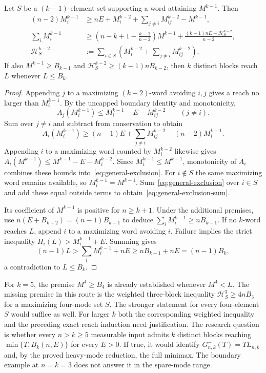 \begin{lemma}\label{lem:general-exclusion}
Let $S$ be a $(k-1)$-element set supporting a word attaining $M^{k-1}$.
Then
\begin{align}
 (n-2)M_i^{k-1}
 &\ge nE+M_i^{k-2}+\sum_{j\ne i}M_{ij}^{k-2}-M^{k-1},
       \label{eq:general-exclusion}\\
 \sum_iM_i^{k-1}
 &\ge\left(n-k+1-\frac{k-1}{n-2}\right)M^{k-1}
       +\frac{(k-1)nE+\mathcal H_S^{k-2}}{n-2},
       \label{eq:general-exclusion-sum}\\
 \mathcal H_S^{k-2}
 &:=\sum_{i\in S}\left(M_i^{k-2}+\sum_{j\ne i}M_{ij}^{k-2}\right).
       \label{eq:general-weighted-H}
\end{align}
If also $M^{k-1}\ge B_{k-1}$ and
$\mathcal H_S^{k-2}\ge(k-1)nB_{k-2}$, then $k$ distinct blocks reach
$L$ whenever $L\le B_k$.
\end{lemma}
\begin{proof}
Appending $j$ to a maximizing $(k-2)$-word avoiding $i,j$ gives a
reach no larger than $M_i^{k-1}$. By the uncapped boundary identity
and monotonicity,
\[
 A_j(M_i^{k-1})\le M_i^{k-1}-E-M_{ij}^{k-2}\qquad(j\ne i).
\]
Sum over $j\ne i$ and subtract from conservation to obtain
\[
 A_i(M_i^{k-1})\ge(n-1)E+\sum_{j\ne i}M_{ij}^{k-2}
                              -(n-2)M_i^{k-1}.
\]
Appending $i$ to a maximizing word counted by $M_i^{k-2}$ likewise
gives $A_i(M^{k-1})\le M^{k-1}-E-M_i^{k-2}$.
Since $M_i^{k-1}\le M^{k-1}$, monotonicity of $A_i$ combines these
bounds into~\eqref{eq:general-exclusion}. For $i\notin S$ the same
maximizing word remains available, so $M_i^{k-1}=M^{k-1}$.
Sum~\eqref{eq:general-exclusion} over $i\in S$ and add these equal
outside terms to obtain~\eqref{eq:general-exclusion-sum}.

Its coefficient of $M^{k-1}$ is positive for $n\ge k+1$.
Under the additional premises, use
$n(E+B_{k-2})=(n-1)B_{k-1}$ to deduce
$\sum_iM_i^{k-1}\ge nB_{k-1}$. If no $k$-word reaches $L$, append
$i$ to a maximizing word avoiding $i$. Failure implies the strict
inequality $H_i(L)>M_i^{k-1}+E$. Summing gives
\[
 (n-1)L>\sum_iM_i^{k-1}+nE
             \ge nB_{k-1}+nE=(n-1)B_k,
\]
a contradiction to $L\le B_k$.
\end{proof}

For $k=5$, the premise $M^4\ge B_4$ is already established whenever
$M^4<L$. The missing premise in this route is the weighted three-block
inequality $\mathcal H_S^3\ge4nB_3$ for a maximizing four-mode set
$S$. The stronger statement for every four-element $S$ would suffice
as well. For larger $k$ both the corresponding weighted inequality and
the preceding exact reach induction need justification.
The research question is whether every $n>k\ge5$ measurable input admits
$k$ distinct blocks reaching $\min\{T,B_k(n,E)\}$ for every $E>0$.
If true, it would identify $G^-_{n,k}(T)=TL_{n,k}$ and, by the proved
heavy-mode reduction, the full minimax. The boundary example at $n=k=3$
does not answer it in the spare-mode range.

